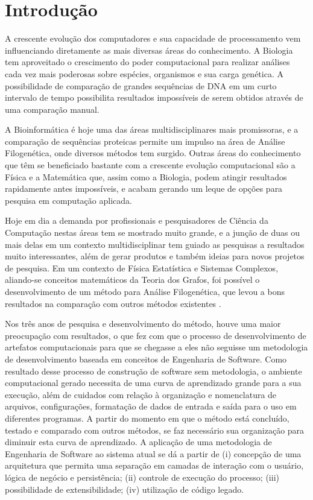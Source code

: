 \chapter{Introdução}

A crescente evolução dos computadores e sua capacidade de processamento vem influenciando diretamente as mais diversas áreas do conhecimento. A Biologia
tem aproveitado o crescimento do poder computacional para realizar análises cada vez mais poderosas sobre espécies, organismos e sua carga genética.
A possibilidade de comparação de grandes sequências de DNA em um curto intervalo de tempo possibilita resultados impossíveis de serem obtidos através
de uma comparação manual.

A Bioinformática é hoje uma das áreas multidisciplinares mais promissoras, e a comparação de sequências proteicas permite um impulso na área de Análise
Filogenética, onde diversos métodos tem surgido. Outras áreas do conhecimento que têm se beneficiado bastante com a crescente evolução computacional são a
Física e a Matemática que, assim como a Biologia, podem atingir resultados rapidamente antes impossíveis, e acabam gerando um leque de opções para pesquisa
em computação aplicada.

Hoje em dia a demanda por profissionais e pesquisadores de Ciência da Computação nestas áreas tem se mostrado muito grande, e a junção de duas ou mais delas
em um contexto multidisciplinar tem guiado as pesquisas a resultados muito interessantes, além de gerar produtos e também ideias para novos projetos de
pesquisa. Em um contexto de Física Estatística e Sistemas Complexos, aliando-se conceitos matemáticos da Teoria dos Grafos, foi possível o
desenvolvimento de um método para Análise Filogenética, que levou a bons resultados na comparação com outros métodos existentes \cite{andrade2011}.

Nos três anos de pesquisa e desenvolvimento do método, houve uma maior preocupação com resultados, o que fez com que o processo de desenvolvimento de
artefatos computacionais  para que se chegasse a eles não seguisse um metodologia de desenvolvimento baseada em conceitos de Engenharia de Software. Como
resultado desse processo de construção de software sem metodologia, o ambiente computacional gerado necessita de
uma curva de aprendizado grande para a sua execução, além de cuidados com relação à organização e nomenclatura de arquivos, configurações,
formatação de dados de entrada e saída para o uso em diferentes programas. A partir do momento em que o método está concluído, testado e comparado com
outros métodos, se faz necessário sua organização para diminuir esta curva de aprendizado. A aplicação de uma metodologia de Engenharia de Software ao
sistema atual se dá a partir de (i) concepção de uma arquitetura que permita uma separação em camadas de interação com o usuário, lógica de negócio e
persistência; (ii) controle de execução do processo; (iii) possibilidade de extensibilidade; (iv) utilização de código legado.

